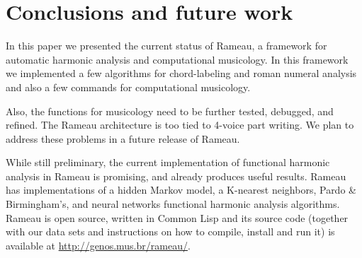 \section{Conclusions and future work}
\label{sec:concl-future-work}

In this paper we presented the current status of Rameau, a framework
for automatic harmonic analysis and computational musicology. In this
framework we implemented a few algorithms for chord-labeling and roman
numeral analysis and also a few commands for computational musicology.

Also, the functions for musicology need to be further tested,
debugged, and refined. The Rameau architecture is too tied to 4-voice
part writing. We plan to address these problems in a future release of
Rameau.

While still preliminary, the current implementation of functional
harmonic analysis in Rameau is promising, and already produces useful
results. Rameau has implementations of a hidden Markov model, a
K-nearest neighbors, Pardo \& Birmingham's, and neural networks
functional harmonic analysis algorithms. Rameau is open source,
written in Common Lisp and its source code (together with our data
sets and instructions on how to compile, install and run it) is
available at \url{http://genos.mus.br/rameau/}.

